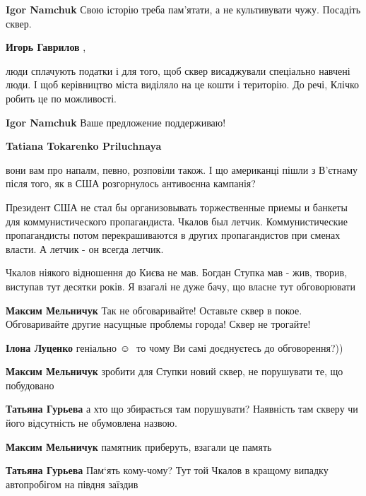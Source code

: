 \begin{itemize}
\begin{itemize}
\begin{itemize}
\textbf{Igor Namchuk} Свою історію треба пам'ятати, а не культивувати чужу. Посадіть сквер.

\textbf{Игорь Гаврилов} , 

люди сплачують податки і для того, щоб сквер висаджували спеціально навчені
люди. І щоб керівництво міста виділяло на це кошти і територію. До речі, Клічко
робить це по можливості.

\textbf{Igor Namchuk} Ваше предложение поддерживаю!
\end{itemize} %

\textbf{Tatiana Tokarenko Priluchnaya} 

вони вам про напалм, певно, розповіли також. І що американці пішли з В'єтнаму
після того, як в США розгорнулось антивоєнна кампанія?

\end{itemize} %


Президент США не стал бы организовывать торжественные приемы и банкеты для
коммунистического пропагандиста. Чкалов был летчик. Коммунистические
пропагандисты потом перекрашиваются в других пропагандистов при сменах власти.
А летчик - он всегда летчик.


Чкалов ніякого відношення до Києва не мав. Богдан Ступка мав - жив, творив,
виступав тут десятки років. Я взагалі не дуже бачу, що власне тут обговорювати

\begin{itemize} %
\textbf{Максим Мельничук} Так не обговаривайте! Оставьте сквер в покое. Обговаривайте другие насущные проблемы города! Сквер не трогайте!

\textbf{Ілона Луценко} геніально  ☺ ️  то чому Ви самі доєднуєтесь до обговорення?))

\textbf{Максим Мельничук} зробити для Ступки новий сквер, не порушувати те, що побудовано

\begin{itemize} %
\textbf{Татьяна Гурьева} а хто що збирається там порушувати? Наявність там скверу чи його відсутність не обумовлена назвою.

\textbf{Максим Мельничук} памятник приберуть, взагали це память

\textbf{Татьяна Гурьева} Пам‘ять кому-чому? Тут той Чкалов в кращому випадку автопробігом на півдня заїздив


\end{itemize}
\end{itemize}
\end{itemize}
